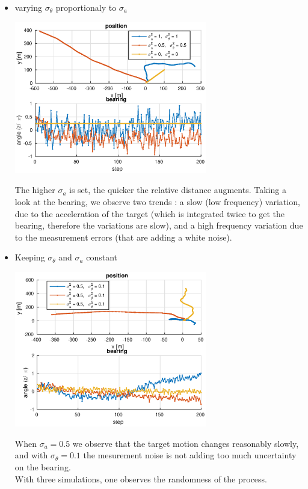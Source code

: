\documentclass[english,DIV=13]{scrreprt}
\begin{document}
\begin{itemize}
\item varying $\sigma_\theta$ proportionaly to $\sigma_a$
\begin{center}
\includegraphics[width=0.66\textwidth]{img/q2_3.eps}
\end{center}
The higher $\sigma_a$ is set, the quicker the relative distance augments. Taking a look at the bearing,
        we observe two trends : a slow (low frequency) variation, due to the acceleration of the target
         (which is integrated twice to get the bearing, therefore the variations are slow), and 
         a high frequency variation due to the measurement errors (that are adding a white noise).

\item  Keeping $\sigma_\theta$ and $\sigma_a$ constant

\begin{center}
 \includegraphics[width=0.66\textwidth]{img/q2_4.eps}
\end{center}
When $\sigma_a=0.5$ we observe that the target motion changes reasonably slowly, and
with $\sigma_{\theta}=0.1$ the mesurement noise is not adding too much uncertainty on the bearing. \\
With three simulations, one observes the randomness of the process.
\end{itemize}
\end{document}
